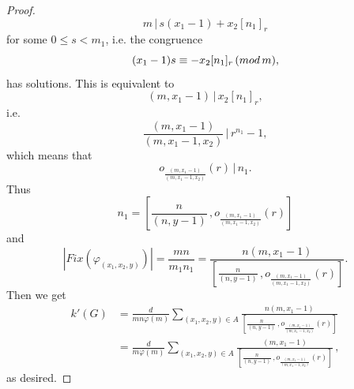 \documentclass[10pt,a4paper]{amsart}
\newcommand{\dd}{\displaystyle }
\begin{document}
\begin{proof}
\begin{equation}
\!\!m\,|\,s(x_1-1)+x_2[n_1]_r\nonumber
\end{equation}for some $0\leq s<m_1$, i.e. the congruence
\begin{equation}
(x_1-1)s\equiv -x_2[n_1]_r\, ({\rm mod}\, m),\nonumber
\end{equation}has solutions. This is equivalent to
\begin{equation}
(m,x_1-1)\,|\,x_2[n_1]_r,\nonumber
\end{equation}i.e.
\begin{equation}
\frac{(m,x_1-1)}{(m,x_1-1,x_2)}\,|\,r^{n_1}-1,\nonumber
\end{equation}which means that
\begin{equation}
o_{\frac{(m,x_1-1)}{(m,x_1-1,x_2)}}(r)\,|\,n_1.\nonumber
\end{equation}Thus
\begin{equation}
n_1=\left[\frac{n}{(n,y-1)}\,, o_{\frac{(m,x_1-1)}{(m,x_1-1,x_2)}}(r)\right]\nonumber
\end{equation}and
\begin{equation}
|Fix(\varphi_{(x_1,x_2,y)})|=\frac{mn}{m_1n_1}=\frac{n(m,x_1-1)}{\left[\frac{n}{(n,y-1)}\,, o_{\frac{(m,x_1-1)}{(m,x_1-1,x_2)}}(r)\right]}.\nonumber
\end{equation}Then we get
\begin{align*}
k'(G)&=\dd\frac{d}{mn\varphi(m)}\dd\sum_{(x_1,x_2,y)\in A}\frac{n(m,x_1-1)}{\left[\frac{n}{(n,y-1)}\,, o_{\frac{(m,x_1-1)}{(m,x_1-1,x_2)}}(r)\right]}\\
&=\dd\frac{d}{m\varphi(m)}\dd\sum_{(x_1,x_2,y)\in A}\frac{(m,x_1-1)}{\left[\frac{n}{(n,y-1)}\,, o_{\frac{(m,x_1-1)}{(m,x_1-1,x_2)}}(r)\right]}\,,\nonumber
\end{align*}as desired.
\end{proof}
\end{document}
